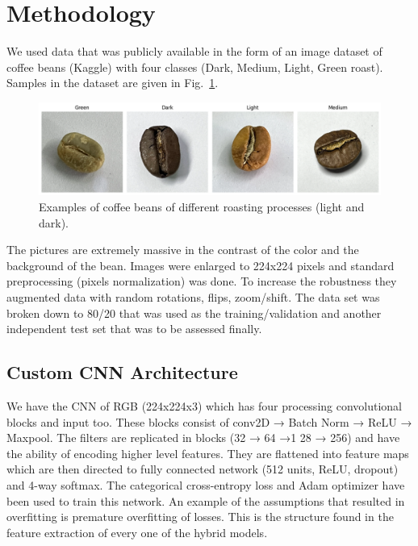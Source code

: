 \documentclass[conference]{IEEEtran}
\begin{document}
\section{Methodology}
We used data that was publicly available in the form of an image dataset of coffee beans (Kaggle) with four classes (Dark, Medium, Light, Green roast). Samples in the dataset are given in Fig.~\ref{fig: beans}. 

\begin{figure}[htbp]
    \centering
    \includegraphics[scale=0.50]{beans.png}
    \caption{Examples of coffee beans of different roasting processes (light and dark).
    }
    \label{fig: beans}
\end{figure}
The pictures are extremely massive in the contrast of the color and the background of the bean. Images were enlarged to 224x224 pixels and standard preprocessing (pixels normalization) was done. To increase the robustness they augmented data with random rotations, flips, zoom/shift. The data set was broken down to 80/20 that was used as the training/validation and another independent test set that was to be assessed finally.

\subsection{Custom CNN Architecture}
We have the CNN of RGB (224x224x3) which has four processing convolutional blocks and input too. These blocks consist of conv2D → Batch Norm → ReLU → Maxpool. The filters are replicated in blocks (32 → 64 →1 28 → 256) and have the ability of encoding higher level features. They are flattened into feature maps which are then directed to fully connected network (512 units, ReLU, dropout) and 4-way softmax. The categorical cross-entropy loss and Adam optimizer have been used to train this network. An example of the assumptions that resulted in overfitting is premature overfitting of losses. This is the structure found in the feature extraction of every one of the hybrid models.
\end{document}
